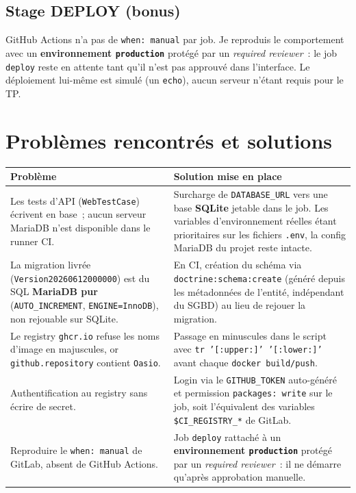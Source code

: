 \documentclass[11pt,a4paper]{article}
\begin{document}
\subsection{Stage DEPLOY (bonus)}

GitHub Actions n'a pas de \texttt{when: manual} par job. Je reproduis le comportement avec un
\textbf{environnement \texttt{production}} protégé par un \emph{required reviewer}~: le job
\texttt{deploy} reste en attente tant qu'il n'est pas approuvé dans l'interface. Le déploiement
lui-même est simulé (un \texttt{echo}), aucun serveur n'étant requis pour le TP.

\section{Problèmes rencontrés et solutions}

\begin{tabularx}{\textwidth}{@{}P{6.2cm} Y@{}}
\toprule
\textbf{Problème} & \textbf{Solution mise en place} \\
\midrule
Les tests d'API (\texttt{WebTestCase}) écrivent en base~; aucun serveur MariaDB n'est disponible
dans le runner CI. &
Surcharge de \texttt{DATABASE\_URL} vers une base \textbf{SQLite} jetable dans le job. Les variables
d'environnement réelles étant prioritaires sur les fichiers \texttt{.env}, la config MariaDB du
projet reste intacte. \\[4pt]
La migration livrée (\texttt{Version20260612000000}) est du SQL \textbf{MariaDB pur}
(\texttt{AUTO\_INCREMENT}, \texttt{ENGINE=InnoDB}), non rejouable sur SQLite. &
En CI, création du schéma via \texttt{doctrine:schema:create} (généré depuis les métadonnées de
l'entité, indépendant du SGBD) au lieu de rejouer la migration. \\[4pt]
Le registry \texttt{ghcr.io} refuse les noms d'image en majuscules, or
\texttt{github.repository} contient \texttt{Oasio}. &
Passage en minuscules dans le script avec \texttt{tr '[:upper:]' '[:lower:]'} avant chaque
\texttt{docker build/push}. \\[4pt]
Authentification au registry sans écrire de secret. &
Login via le \texttt{GITHUB\_TOKEN} auto-généré et permission \texttt{packages: write} sur le job,
soit l'équivalent des variables \texttt{\$CI\_REGISTRY\_*} de GitLab. \\[4pt]
Reproduire le \texttt{when: manual} de GitLab, absent de GitHub Actions. &
Job \texttt{deploy} rattaché à un \textbf{environnement \texttt{production}} protégé par un
\emph{required reviewer}~: il ne démarre qu'après approbation manuelle. \\
\bottomrule
\end{tabularx}
\end{document}
